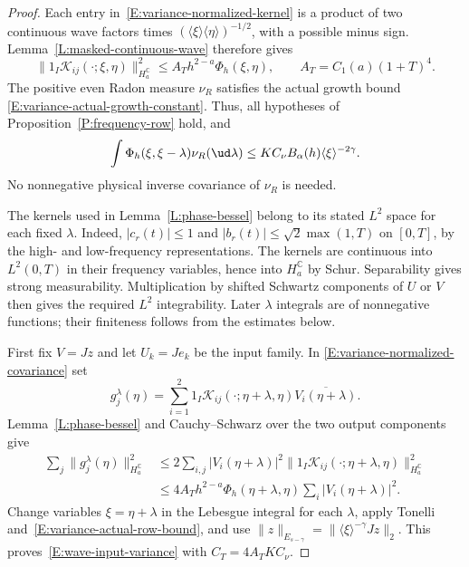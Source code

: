 \begin{proof}
  Each entry in~\eqref{E:variance-normalized-kernel} is a product of two
  continuous wave factors times
  $(\langle\xi\rangle\langle\eta\rangle)^{-1/2}$, with a possible minus
  sign. Lemma~\ref{L:masked-continuous-wave} therefore gives
  \begin{equation}\label{E:variance-kernel-time-bound}
    \|1_I\mathcal K_{ij}(\cdot;\xi,\eta)\|_{H_a^{\mathbb C}}^2
    \le A_T h^{2-a}\Phi_h(\xi,\eta),
    \qquad A_T = C_1(a)(1+T)^4.
  \end{equation}
  The positive even Radon measure $\nu_R$ satisfies the actual growth bound
  \eqref{E:variance-actual-growth-constant}. Thus, all hypotheses of
  Proposition~\ref{P:frequency-row} hold, and
  \begin{equation}\label{E:variance-actual-row-bound}
    \int\Phi_h(\xi,\xi-\lambda)\nu_R(\ud\lambda)
    \le K C_\nu B_\alpha(h)\langle\xi\rangle^{-2\gamma}.
  \end{equation}
  No nonnegative physical inverse covariance of $\nu_R$ is needed.

  The kernels used in Lemma~\ref{L:phase-bessel} belong to its stated
  $L^2$ space for each fixed $\lambda$. Indeed,
  $|c_r(t)| \le 1$ and $|b_r(t)| \le \sqrt{2}\max(1,T)$ on $[0,T]$,
  by the high- and low-frequency representations. The kernels are
  continuous into $L^2(0,T)$ in their frequency variables, hence into
  $H_a^{\mathbb C}$ by Schur. Separability gives strong measurability.
  Multiplication by shifted Schwartz components of $U$ or $V$ then gives
  the required $L^2$ integrability. Later $\lambda$ integrals are of
  nonnegative functions; their finiteness follows from the estimates below.

  First fix $V = Jz$ and let $U_k = Je_k$ be the input family. In
  \eqref{E:variance-normalized-covariance} set
  \[
    g_j^\lambda(\eta) = \sum_{i=1}^2
    1_I\mathcal K_{ij}(\cdot;\eta+\lambda,\eta)
    \overline{V_i(\eta+\lambda)}.
  \]
  Lemma~\ref{L:phase-bessel} and Cauchy--Schwarz over the two output
  components give
  \begin{align*}
    \sum_j\|g_j^\lambda(\eta)\|_{H_a^{\mathbb C}}^2
    &\le 2\sum_{i,j}|V_i(\eta+\lambda)|^2
    \|1_I\mathcal K_{ij}(\cdot;\eta+\lambda,\eta)\|_{H_a^{\mathbb C}}^2\\
    &\le 4A_T h^{2-a}\Phi_h(\eta+\lambda,\eta)
    \sum_i|V_i(\eta+\lambda)|^2.
  \end{align*}
  Change variables $\xi = \eta+\lambda$ in the Lebesgue integral for
  each $\lambda$, apply Tonelli and~\eqref{E:variance-actual-row-bound},
  and use $\|z\|_{E_{s-\gamma}} = \|\langle\xi\rangle^{-\gamma}Jz\|_2$.
  This proves~\eqref{E:wave-input-variance} with $C_T = 4A_TKC_\nu$.


\end{proof}
